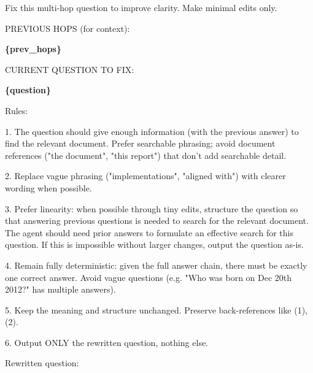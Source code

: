 \begin{tcolorbox}[colback=white, colframe=my-green, coltitle=black, parskip=5mm, title=\textbf{Question Rewording}, halign=flush left, enhanced, breakable, skin first=enhanced, skin middle=enhanced, skin last=enhanced]
\begin{scriptsize}
\ttfamily
\setlength{\parindent}{0pt}
Fix this multi-hop question to improve clarity. Make minimal edits only.\par
\mbox{}\par
PREVIOUS HOPS (for context):\par
\textcolor{my-green}{\textbf{\{prev\_hops\}}}\par
\mbox{}\par
CURRENT QUESTION TO FIX:\par
\textcolor{my-green}{\textbf{\{question\}}}\par
\mbox{}\par
Rules:\par
1. The question should give enough information (with the previous answer) to find the relevant document. Prefer searchable phrasing; avoid document references ("the document", "this report") that don't add searchable detail.\par
2. Replace vague phrasing ("implementations", "aligned with") with clearer wording when possible.\par
3. Prefer linearity: when possible through tiny edits, structure the question so that answering previous questions is needed to search for the relevant document. The agent should need prior answers to formulate an effective search for this question. If this is impossible without larger changes, output the question as-is.\par
4. Remain fully deterministic: given the full answer chain, there must be exactly one correct answer. Avoid vague questions (e.g. "Who was born on Dec 20th 2012?" has multiple answers).\par
5. Keep the meaning and structure unchanged. Preserve back-references like (1), (2).\par
6. Output ONLY the rewritten question, nothing else.\par
\mbox{}\par
Rewritten question:\par
\end{scriptsize}
\end{tcolorbox}

